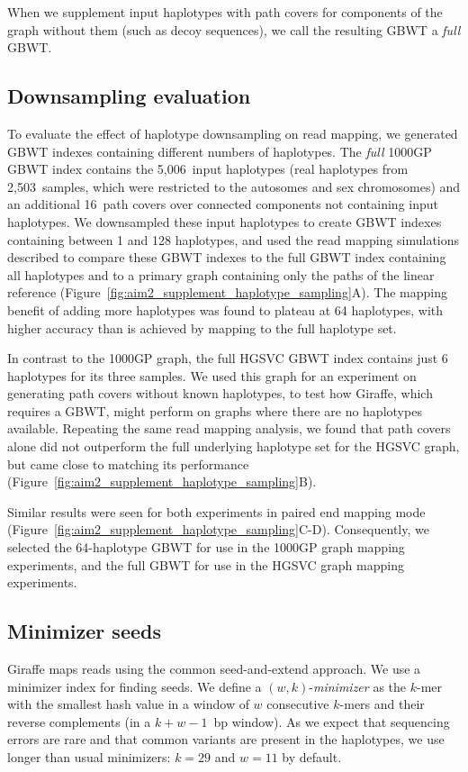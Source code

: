 \documentclass[11pt]{ucscthesis}
\newcommand{\vocab}[1]{\emph{#1}}
\begin{document}
When we supplement input haplotypes with path covers for components of the graph without them (such as decoy sequences), we call the resulting GBWT a \vocab{full} GBWT.

\subsection{Downsampling evaluation}
\label{subsec:aim2:downsamplingeval}

To evaluate the effect of haplotype downsampling on read mapping, we generated GBWT indexes containing different numbers of haplotypes.
The \vocab{full} 1000GP GBWT index contains the 5,006~input haplotypes (real haplotypes from 2,503~samples, which were restricted to the autosomes and sex chromosomes) and an additional 16~path covers over connected components not containing input haplotypes.
We downsampled these input haplotypes to create GBWT indexes containing between 1 and 128 haplotypes, and used the read mapping simulations described to compare these GBWT indexes to the full GBWT index containing all haplotypes and to a primary graph containing only the paths of the linear reference (Figure~\ref{fig:aim2_supplement_haplotype_sampling}A).
The mapping benefit of adding more haplotypes was found to plateau at 64 haplotypes, with higher accuracy than is achieved by mapping to the full haplotype set.

In contrast to the 1000GP graph, the full HGSVC GBWT index contains just 6 haplotypes for its three samples. We used this graph for an experiment on generating path covers without known haplotypes, to test how Giraffe, which requires a GBWT, might perform on graphs where there are no haplotypes available. Repeating the same read mapping analysis, we found that path covers alone did not outperform the full underlying haplotype set for the HGSVC graph, but came close to matching its performance (Figure~\ref{fig:aim2_supplement_haplotype_sampling}B).

Similar results were seen for both experiments in paired end mapping mode (Figure~\ref{fig:aim2_supplement_haplotype_sampling}C-D). Consequently, we selected the 64-haplotype GBWT for use in the 1000GP graph mapping experiments, and the full GBWT for use in the HGSVC graph mapping experiments.


\subsection{Minimizer seeds}
\label{subsec:aim2:minimizers}
Giraffe maps reads using the common seed-and-extend approach.
We use a minimizer index \cite{Roberts2004} for finding seeds.
We define a $(w,k)$-\vocab{minimizer} as the $k$-mer with the smallest hash value in a window of $w$ consecutive $k$-mers and their reverse complements (in a $k+w-1$~bp window).
As we expect that sequencing errors are rare and that common variants are present in the haplotypes, we use longer than usual minimizers: $k = 29$ and $w = 11$ by default.
\end{document}
